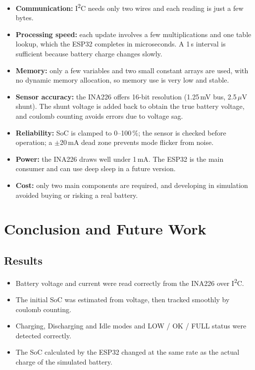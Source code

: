 \documentclass[12pt,a4paper,oneside]{report}
\begin{document}
\begin{itemize}
  \item \textbf{Communication:} I\textsuperscript{2}C needs only two wires and each reading is just a few bytes.
  \item \textbf{Processing speed:} each update involves a few multiplications and one table lookup, which the ESP32 completes in microseconds. A 1\,s interval is sufficient because battery charge changes slowly.
  \item \textbf{Memory:} only a few variables and two small constant arrays are used, with no dynamic memory allocation, so memory use is very low and stable.
  \item \textbf{Sensor accuracy:} the INA226 offers 16-bit resolution (1.25\,mV bus, 2.5\,$\mu$V shunt). The shunt voltage is added back to obtain the true battery voltage, and coulomb counting avoids errors due to voltage sag.
  \item \textbf{Reliability:} SoC is clamped to 0--100\,\%; the sensor is checked before operation; a $\pm$20\,mA dead zone prevents mode flicker from noise.
  \item \textbf{Power:} the INA226 draws well under 1\,mA. The ESP32 is the main consumer and can use deep sleep in a future version.
  \item \textbf{Cost:} only two main components are required, and developing in simulation avoided buying or risking a real battery.
\end{itemize}

\chapter{Conclusion and Future Work}\label{ch:concl}

\section{Results}
\begin{itemize}
  \item Battery voltage and current were read correctly from the INA226 over I\textsuperscript{2}C.
  \item The initial SoC was estimated from voltage, then tracked smoothly by coulomb counting.
  \item Charging, Discharging and Idle modes and LOW / OK / FULL status were detected correctly.
  \item The SoC calculated by the ESP32 changed at the same rate as the actual charge of the simulated battery.
\end{itemize}
\end{document}
